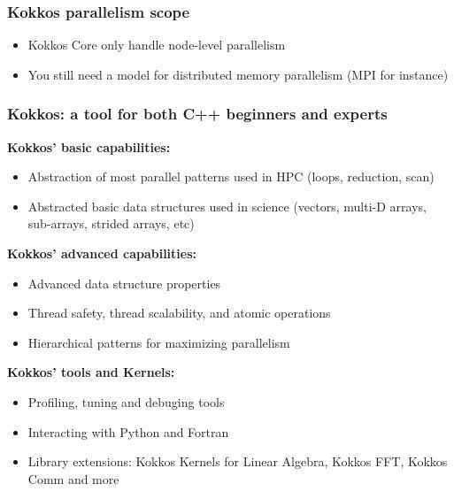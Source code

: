 \documentclass[aspectratio=169]{beamer}
\begin{document}

\begin{frame}
    \frametitle{Kokkos parallelism scope}

    \begin{itemize}
        \item Kokkos Core only handle node-level parallelism
        \item You still need a model for distributed memory parallelism (MPI for instance)
    \end{itemize}


\end{frame}


\begin{frame}
    \frametitle{Kokkos: a tool for both C++ beginners and experts} 
    \textbf{Kokkos' basic capabilities:}
    \begin{itemize}
        \item Abstraction of most parallel patterns used in HPC (loops, reduction, scan)
        \item Abstracted basic data structures used in science (vectors, multi-D arrays, sub-arrays, strided arrays, etc)
    \end{itemize}
    \textbf{Kokkos' advanced capabilities:}
    \begin{itemize}
        \item Advanced data structure properties
        \item Thread safety, thread scalability, and atomic operations
        \item Hierarchical patterns for maximizing parallelism 
    \end{itemize}
    \textbf{Kokkos' tools and Kernels:}
    \begin{itemize}
        \item Profiling, tuning and debuging tools
        \item Interacting with Python and Fortran
        \item Library extensions: Kokkos Kernels for Linear Algebra, Kokkos FFT, Kokkos Comm and more 
    \end{itemize}
\end{frame}

\end{document}
